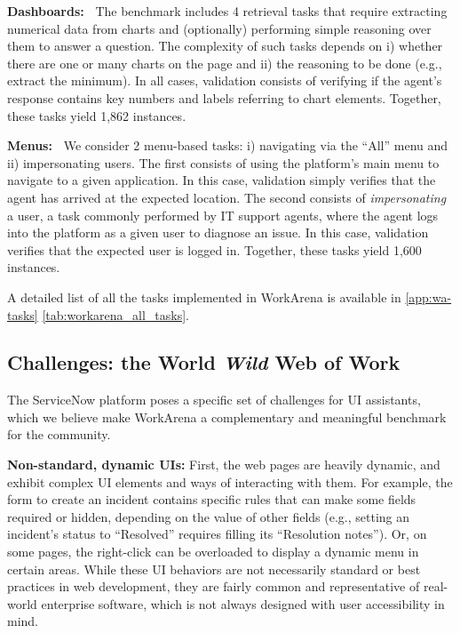 \documentclass{article}
\theoremstyle{plain}
\theoremstyle{definition}
\theoremstyle{remark}
\newcommand{\paragraphtight}[1]{\textbf{#1~}}
\begin{document}
\paragraphtight{Dashboards:} The benchmark includes 4 retrieval tasks that require extracting numerical data from charts and (optionally) performing simple reasoning over them to answer a question. The complexity of such tasks depends on i) whether there are one or many charts on the page and ii) the reasoning to be done (e.g., extract the minimum).
In all cases, validation consists of verifying if the agent's response contains key numbers and labels referring to chart elements.
Together, these tasks yield 1,862 instances.

\paragraphtight{Menus:} We consider 2 menu-based tasks: i) navigating via the ``All'' menu and ii) impersonating users. The first consists of using the platform's main menu to navigate to a given application. In this case, validation simply verifies that the agent has arrived at the expected location. The second consists of \emph{impersonating} a user, a task commonly performed by IT support agents, where the agent logs into the platform as a given user to diagnose an issue. In this case, validation verifies that the expected user is logged in. Together, these tasks yield 1,600 instances.

A detailed list of all the tasks implemented in WorkArena is available in \cref{app:wa-tasks} \cref{tab:workarena_all_tasks}.

\subsection{Challenges: the World \emph{Wild} Web of Work}
\label{sec:workarena_challenges}

The ServiceNow platform poses a specific set of challenges for UI assistants, which we believe make WorkArena a complementary and meaningful benchmark for the community.

\textbf{Non-standard, dynamic UIs:} First, the web pages are heavily dynamic, and exhibit complex UI elements and ways of interacting with them. For example, the form to create an incident contains specific rules that can make some fields required or hidden, depending on the value of other fields (e.g., setting an incident's status to ``Resolved'' requires filling its ``Resolution notes''). Or, on some pages, the right-click can be overloaded to display a dynamic menu in certain areas. While these UI behaviors are not necessarily standard or best practices in web development, they are fairly common and representative of real-world enterprise software, which is not always designed with user accessibility in mind.
\end{document}
